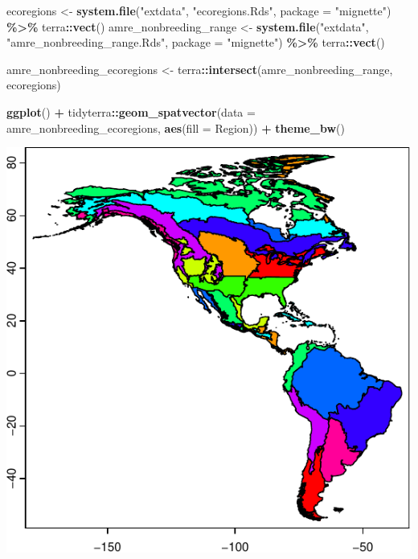 \documentclass[
]{book}
\newenvironment{Shaded}{\begin{snugshade}}{\end{snugshade}}
\newcommand{\AttributeTok}[1]{\textcolor[rgb]{0.13,0.29,0.53}{#1}}
\newcommand{\FunctionTok}[1]{\textcolor[rgb]{0.13,0.29,0.53}{\textbf{#1}}}
\newcommand{\NormalTok}[1]{#1}
\newcommand{\OtherTok}[1]{\textcolor[rgb]{0.56,0.35,0.01}{#1}}
\newcommand{\SpecialCharTok}[1]{\textcolor[rgb]{0.81,0.36,0.00}{\textbf{#1}}}
\newcommand{\StringTok}[1]{\textcolor[rgb]{0.31,0.60,0.02}{#1}}
\begin{document}
\begin{Shaded}
\begin{Highlighting}[]
\NormalTok{ecoregions }\OtherTok{\textless{}{-}} \FunctionTok{system.file}\NormalTok{(}\StringTok{"extdata"}\NormalTok{, }\StringTok{"ecoregions.Rds"}\NormalTok{,}
                          \AttributeTok{package =} \StringTok{"mignette"}\NormalTok{) }\SpecialCharTok{\%\textgreater{}\%}
\NormalTok{  terra}\SpecialCharTok{::}\FunctionTok{vect}\NormalTok{()}
\NormalTok{amre\_nonbreeding\_range }\OtherTok{\textless{}{-}} \FunctionTok{system.file}\NormalTok{(}\StringTok{"extdata"}\NormalTok{, }\StringTok{"amre\_nonbreeding\_range.Rds"}\NormalTok{,}
                                      \AttributeTok{package =} \StringTok{"mignette"}\NormalTok{) }\SpecialCharTok{\%\textgreater{}\%}
\NormalTok{  terra}\SpecialCharTok{::}\FunctionTok{vect}\NormalTok{()}

\NormalTok{amre\_nonbreeding\_ecoregions }\OtherTok{\textless{}{-}}\NormalTok{ terra}\SpecialCharTok{::}\FunctionTok{intersect}\NormalTok{(amre\_nonbreeding\_range, ecoregions)}

\FunctionTok{ggplot}\NormalTok{() }\SpecialCharTok{+}
\NormalTok{  tidyterra}\SpecialCharTok{::}\FunctionTok{geom\_spatvector}\NormalTok{(}\AttributeTok{data =}\NormalTok{ amre\_nonbreeding\_ecoregions, }
                  \FunctionTok{aes}\NormalTok{(}\AttributeTok{fill =}\NormalTok{ Region)) }\SpecialCharTok{+}
  \FunctionTok{theme\_bw}\NormalTok{()}
\end{Highlighting}
\end{Shaded}

\includegraphics{Mignette_files/figure-latex/unnamed-chunk-11-1.pdf}
\end{document}
